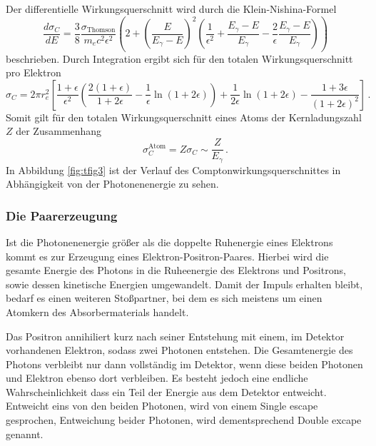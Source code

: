 \noindent
Der differentielle Wirkungsquerschnitt wird durch die Klein-Nishina-Formel
\begin{equation}
\frac{d \sigma_C}{dE} = \frac{3}{8}\frac{\sigma_{\text{Thomson}}}{m_e c^2 \epsilon^2}\left(2+\left(\frac{E}{E_{\gamma}-E}\right)^2
\left(\frac{1}{\epsilon^2}+\frac{E_{\gamma}-E}{E_{\gamma}}-\frac{2}{\epsilon}\frac{E_{\gamma}-E}{E_{\gamma}}\right)\right)
\end{equation}
beschrieben.
Durch Integration ergibt sich für den totalen Wirkungsquerschnitt pro Elektron \cite{quelle03}
\begin{equation}
\sigma_C = 2\pi r_e^2\left[\frac{1+\epsilon}{\epsilon^2}\left(\frac{2(1+\epsilon)}{1+2\epsilon}-\frac{1}{\epsilon}\ln(1+2\epsilon)\right)
+\frac{1}{2\epsilon}\ln(1+2\epsilon)-\frac{1+3\epsilon}{(1+2\epsilon)^2}\right]\, .
\end{equation}
Somit gilt für den totalen Wirkungsquerschnitt eines Atoms der Kernladungszahl $Z$ der Zusammenhang
\begin{equation}
\sigma_C^{\text{Atom}} = Z \sigma_C \sim \frac{Z}{E_{\gamma}}\, .
\end{equation}
In Abbildung \ref{fig:tfig3} ist der Verlauf des Comptonwirkungsquerschnittes in Abhängigkeit von der Photonenenergie zu sehen.

\subsubsection*{Die Paarerzeugung}\label{sec:paar}
Ist die Photonenenergie größer als die doppelte Ruhenergie eines Elektrons kommt es zur Erzeugung eines Elektron-Positron-Paares.
Hierbei wird die gesamte Energie des Photons in die Ruheenergie des Elektrons und Positrons, sowie dessen kinetische Energien umgewandelt.
Damit der Impuls erhalten bleibt, bedarf es einen weiteren Stoßpartner, bei dem es sich meistens um einen Atomkern des Absorbermaterials handelt.

Das Positron annihiliert kurz nach seiner Entstehung mit einem, im Detektor vorhandenen Elektron, sodass zwei Photonen entstehen.
Die Gesamtenergie des Photons verbleibt nur dann vollständig im Detektor, wenn diese beiden Photonen und Elektron ebenso dort verbleiben.
Es besteht jedoch eine endliche Wahrscheinlichkeit dass ein Teil der Energie aus dem Detektor entweicht.
Entweicht eins von den beiden Photonen, wird von einem Single escape gesprochen, Entweichung beider Photonen, wird dementsprechend Double excape genannt.

